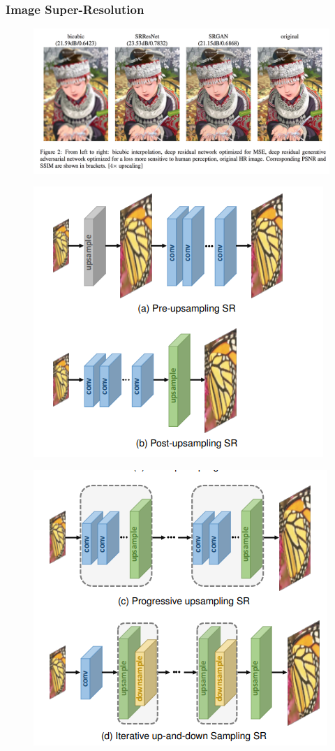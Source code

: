 \documentclass[presentation]{beamer}
\begin{document}
\begin{frame}[allowframebreaks]
    \frametitle{Image Super-Resolution}

    \begin{figure}
        \centering
        \includegraphics[width=0.95\linewidth]{7.png}
        \caption{}
    \end{figure}

    \begin{figure}
        \centering
        \includegraphics[width=0.6\linewidth]{7_1.png}
    \end{figure}

    \begin{figure}
        \centering
        \includegraphics[width=0.6\linewidth]{7_2.png}
    \end{figure}

\end{frame}
\end{document}
